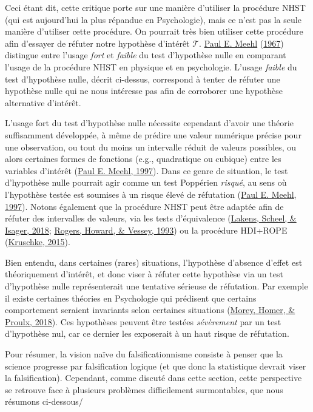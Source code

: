 \documentclass[
  a4paper,11pt,twoside,onecolumn,openright,final,oldfontcommands]{memoir}
\theoremstyle{definition}
\theoremstyle{definition}
\theoremstyle{definition}
\theoremstyle{remark}
\begin{document}
Ceci étant dit, cette critique porte sur une manière d'utiliser la procédure NHST (qui est aujourd'hui la plus répandue en Psychologie), mais ce n'est pas la seule manière d'utiliser cette procédure. On pourrait très bien utiliser cette procédure afin d'essayer de réfuter notre hypothèse d'intérêt \(\mathcal{T}\). \protect\hyperlink{ref-meehl_theory-testing_1967}{Paul E. Meehl} (\protect\hyperlink{ref-meehl_theory-testing_1967}{1967}) distingue entre l'usage \emph{fort} et \emph{faible} du test d'hypothèse nulle en comparant l'usage de la procédure NHST en physique et en psychologie. L'usage \emph{faible} du test d'hypothèse nulle, décrit ci-dessus, correspond à tenter de réfuter une hypothèse nulle qui ne nous intéresse pas afin de corroborer une hypothèse alternative d'intérêt.

L'usage fort du test d'hypothèse nulle nécessite cependant d'avoir une théorie suffisamment développée, à même de prédire une valeur numérique précise pour une observation, ou tout du moins un intervalle réduit de valeurs possibles, ou alors certaines formes de fonctions (e.g., quadratique ou cubique) entre les variables d'intérêt (\protect\hyperlink{ref-harlow_problem_1997}{Paul E. Meehl, 1997}). Dans ce genre de situation, le test d'hypothèse nulle pourrait agir comme un test Poppérien \emph{risqué}, au sens où l'hypothèse testée est soumises à un risque élevé de réfutation (\protect\hyperlink{ref-harlow_problem_1997}{Paul E. Meehl, 1997}). Notons également que la procédure NHST peut être adaptée afin de réfuter des intervalles de valeurs, via les tests d'équivalence (\protect\hyperlink{ref-lakens_equivalence_2018}{Lakens, Scheel, \& Isager, 2018}; \protect\hyperlink{ref-rogers_using_1993}{Rogers, Howard, \& Vessey, 1993}) ou la procédure HDI+ROPE (\protect\hyperlink{ref-kruschke_doing_2015}{Kruschke, 2015}).

Bien entendu, dans certaines (rares) situations, l'hypothèse d'absence d'effet est théoriquement d'intérêt, et donc viser à réfuter cette hypothèse via un test d'hypothèse nulle représenterait une tentative sérieuse de réfutation. Par exemple il existe certaines théories en Psychologie qui prédisent que certains comportement seraient invariants selon certaines situations (\protect\hyperlink{ref-morey_beyond_2018}{Morey, Homer, \& Proulx, 2018}). Ces hypothèses peuvent être testées \emph{sévèrement} par un test d'hypothèse nul, car ce dernier les exposerait à un haut risque de réfutation.

Pour résumer, la vision naïve du falsificationnisme consiste à penser que la science progresse par falsification logique (et que donc la statistique devrait viser la falsification). Cependant, comme discuté dans cette section, cette perspective se retrouve face à plusieurs problèmes difficilement surmontables, que nous résumons ci-dessous/
\end{document}

